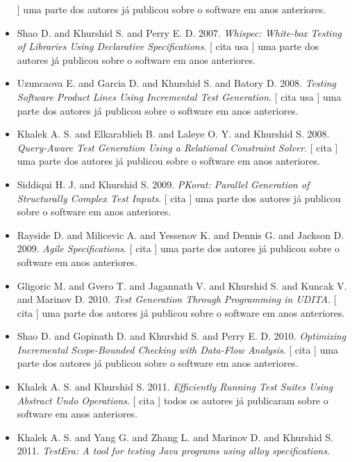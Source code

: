 \begin{itemize}
      ]
uma parte dos autores já publicou sobre o software em anos anteriores.
\item Shao D. and Khurshid S. and Perry E. D.
      2007.
        \textit{ Whispec: White-box Testing of Libraries Using Declarative Specifications}.
      [
          cita
          usa
      ]
uma parte dos autores já publicou sobre o software em anos anteriores.
\item Uzuncaova E. and Garcia D. and Khurshid S. and Batory D.
      2008.
        \textit{ Testing Software Product Lines Using Incremental Test Generation}.
      [
          cita
          usa
      ]
uma parte dos autores já publicou sobre o software em anos anteriores.
\item Khalek A. S. and Elkarablieh B. and Laleye O. Y. and Khurshid S.
      2008.
        \textit{ Query-Aware Test Generation Using a Relational Constraint Solver}.
      [
          cita
      ]
uma parte dos autores já publicou sobre o software em anos anteriores.
\item Siddiqui H. J. and Khurshid S.
      2009.
        \textit{ PKorat: Parallel Generation of Structurally Complex Test Inputs}.
      [
          cita
      ]
uma parte dos autores já publicou sobre o software em anos anteriores.
\item Rayside D. and Milicevic A. and Yessenov K. and Dennis G. and Jackson D.
      2009.
        \textit{ Agile Specifications}.
      [
          cita
      ]
uma parte dos autores já publicou sobre o software em anos anteriores.
\item Gligoric M. and Gvero T. and Jagannath V. and Khurshid S. and Kuncak V. and Marinov D.
      2010.
        \textit{ Test Generation Through Programming in UDITA}.
      [
          cita
      ]
uma parte dos autores já publicou sobre o software em anos anteriores.
\item Shao D. and Gopinath D. and Khurshid S. and Perry E. D.
      2010.
        \textit{ Optimizing Incremental Scope-Bounded Checking with Data-Flow Analysis}.
      [
          cita
      ]
uma parte dos autores já publicou sobre o software em anos anteriores.
\item Khalek A. S. and Khurshid S.
      2011.
        \textit{ Efficiently Running Test Suites Using Abstract Undo Operations}.
      [
          cita
      ]
todos os autores já publicaram sobre o software em anos anteriores.
\item Khalek A. S. and Yang G. and Zhang L. and Marinov D. and Khurshid S.
      2011.
        \textit{ TestEra: A tool for testing Java programs using alloy specifications}.

\end{itemize}
